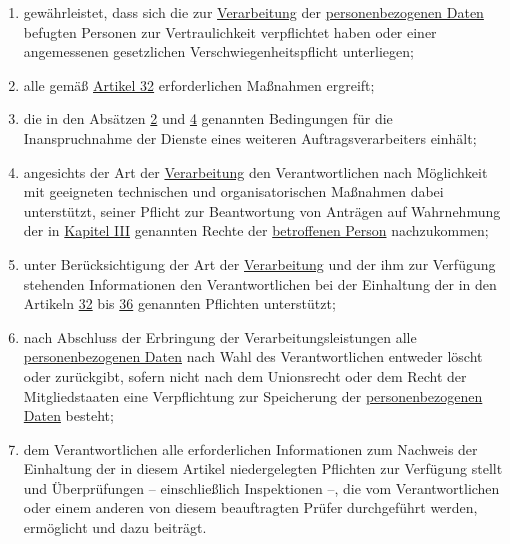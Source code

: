 \begin{enumerate}
\begin{enumerate}
    \item gewährleistet, dass sich die zur \hyperref[itm:04-2]{Verarbeitung} der \hyperref[itm:04-1]{personenbezogenen Daten} befugten Personen zur
     Vertraulichkeit verpflichtet haben oder einer angemessenen gesetzlichen Verschwiegenheitspflicht unterliegen;
    \label{itm:28-3-1b}

    \item alle gemäß \hyperref[ch:32]{Artikel 32} erforderlichen Maßnahmen ergreift;
    \label{itm:28-3-1c}

    \item die in den Absätzen \hyperref[itm:28-2]{2} und \hyperref[itm:28-4]{4} genannten Bedingungen für die
     Inanspruchnahme der Dienste eines weiteren Auftragsverarbeiters einhält;
    \label{itm:28-3-1d}

    \item angesichts der Art der \hyperref[itm:04-2]{Verarbeitung} den Verantwortlichen nach Möglichkeit mit geeigneten technischen und
     organisatorischen Maßnahmen dabei unterstützt, seiner Pflicht zur Beantwortung von Anträgen auf Wahrnehmung der in
     \hyperref[part:3]{Kapitel III} genannten Rechte der \hyperref[itm:04-1]{betroffenen Person} nachzukommen;
    \label{itm:28-3-1e}

    \item unter Berücksichtigung der Art der \hyperref[itm:04-2]{Verarbeitung} und der ihm zur Verfügung stehenden Informationen den
     Verantwortlichen bei der Einhaltung der in den Artikeln \hyperref[ch:32]{32} bis \hyperref[ch:36]{36} genannten
     Pflichten unterstützt;
    \label{itm:28-3-1f}

    \item nach Abschluss der Erbringung der Verarbeitungsleistungen alle \hyperref[itm:04-1]{personenbezogenen Daten} nach Wahl des
     Verantwortlichen entweder löscht oder zurückgibt, sofern nicht nach dem Unionsrecht oder dem Recht der
     Mitgliedstaaten eine Verpflichtung zur Speicherung der \hyperref[itm:04-1]{personenbezogenen Daten} besteht;
    \label{itm:28-3-1g}

    \item dem Verantwortlichen alle erforderlichen Informationen zum Nachweis der Einhaltung der in diesem Artikel
     niedergelegten Pflichten zur Verfügung stellt und Überprüfungen -- einschließlich Inspektionen –, die vom
     Verantwortlichen oder einem anderen von diesem beauftragten Prüfer durchgeführt werden, ermöglicht und dazu
     beiträgt.
    \label{itm:28-3-1h}


\end{enumerate}
\end{enumerate}
